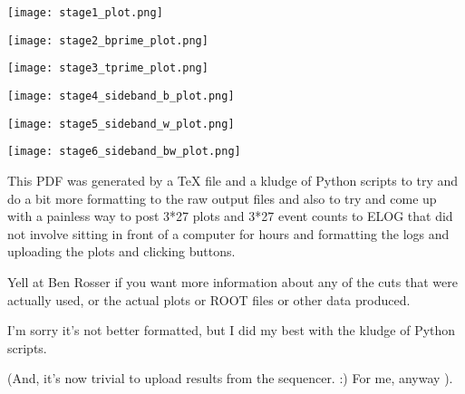 \documentclass{article}
\begin{document}
{
	\small
	
}

\begin{center}
  \texttt{[image: stage1\_plot.png]}
\end{center}

\clearpage

{
	\small
	
}

\begin{center}
  \texttt{[image: stage2\_bprime\_plot.png]}
\end{center}

\clearpage

{
	\small
	
}

\begin{center}
  \texttt{[image: stage3\_tprime\_plot.png]}
\end{center}

\clearpage

{
	\small
	
}

\begin{center}
  \texttt{[image: stage4\_sideband\_b\_plot.png]}
\end{center}

\clearpage

{
	\small
	
}

\begin{center}
  \texttt{[image: stage5\_sideband\_w\_plot.png]}
\end{center}

\clearpage

{
	\small
	
}

\begin{center}
  \texttt{[image: stage6\_sideband\_bw\_plot.png]}
\end{center}

\clearpage

This PDF was generated by a TeX file and a kludge of Python scripts to try and
do a bit more formatting to the raw output files and also to try and come up
with a painless way to post 3*27 plots and 3*27 event counts to ELOG that did
not involve sitting in front of a computer for hours and formatting the logs
and uploading the plots and clicking buttons.

Yell at Ben Rosser if you want more information about any of the cuts that were
actually used, or the actual plots or ROOT files or other data produced.

I'm sorry it's not better formatted, but I did my best with the kludge of Python
scripts.

(And, it's now trivial to upload results from the sequencer. :) For me, anyway ).
\end{document}
